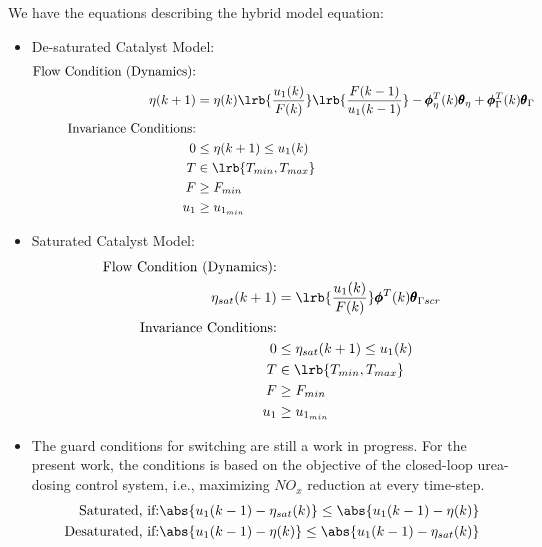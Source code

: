 We have the equations describing the hybrid model equation:
\begin{itemize}
\item De-saturated Catalyst Model:
\begin{align*}
        \text{Flow Condition (Dynamics):} &\\
                \eta(k+1) &= \eta(k) \lrb{\frac{u_1(k)}{F(k)}} \lrb{\frac{F(k-1)}{u_1(k-1)}}
                    - \pmb \phi^T_{\eta}(k) \pmb \theta_{\eta}  + \pmb \phi_{\Gamma}^T(k) \pmb \theta_{\Gamma}
                    \\
        \text{Invariance Conditions:} & \\
                0 &\leq \eta (k+1) \leq u_1(k)\\
                T &\in \lrb{T_{min}, T_{max}}\\
                F &\geq F_{min}\\
                u_1 &\geq u_{1_{min}}
\end{align*}
\item Saturated Catalyst Model:
\begin{align*}
        \text{Flow Condition (Dynamics):} & \\
                \eta_{sat}(k+1) &= \lrb{\frac{u_1(k)}{F(k)}} \pmb \phi^T(k) \pmb \theta_{\Gamma scr}\\
        \text{Invariance Conditions:} & \\
                0 &\leq \eta_{sat} (k+1) \leq u_1(k)\\
                T &\in \lrb{T_{min}, T_{max}}\\
                F &\geq F_{min}\\
                u_1 &\geq u_{1_{min}}
\end{align*}

\item The guard conditions for switching are still a work in progress. For the present work, the conditions is based on the objective of the closed-loop urea-dosing control system, i.e., maximizing $NO_x$ reduction at every time-step.
\begin{align*}
        \text{Saturated, if:} & \abs{u_1(k-1) - \eta_{sat}(k)} \leq \abs{u_1(k-1) - \eta(k)} \\
        \text{Desaturated, if:} & \abs{u_1(k-1) - \eta(k)} \leq \abs{u_1(k-1) - \eta_{sat}(k)}
\end{align*}
\end{itemize}



